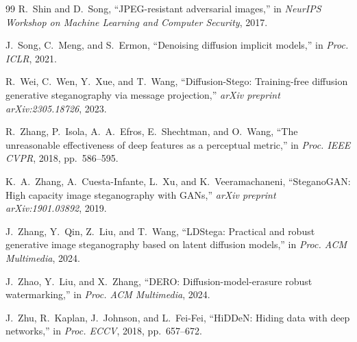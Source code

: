 \documentclass[journal]{IEEEtran}
\begin{document}
\begin{thebibliography}{99}
R.~Shin and D.~Song, ``JPEG-resistant adversarial images,'' in \emph{NeurIPS Workshop on Machine Learning and Computer Security}, 2017.

J.~Song, C.~Meng, and S.~Ermon, ``Denoising diffusion implicit models,'' in \emph{Proc. ICLR}, 2021.

R.~Wei, C.~Wen, Y.~Xue, and T.~Wang, ``Diffusion-Stego: Training-free diffusion generative steganography via message projection,'' \emph{arXiv preprint arXiv:2305.18726}, 2023.

R.~Zhang, P.~Isola, A.~A.~Efros, E.~Shechtman, and O.~Wang, ``The unreasonable effectiveness of deep features as a perceptual metric,'' in \emph{Proc. IEEE CVPR}, 2018, pp.~586--595.

K.~A.~Zhang, A.~Cuesta-Infante, L.~Xu, and K.~Veeramachaneni, ``SteganoGAN: High capacity image steganography with GANs,'' \emph{arXiv preprint arXiv:1901.03892}, 2019.

J.~Zhang, Y.~Qin, Z.~Liu, and T.~Wang, ``LDStega: Practical and robust generative image steganography based on latent diffusion models,'' in \emph{Proc. ACM Multimedia}, 2024.

J.~Zhao, Y.~Liu, and X.~Zhang, ``DERO: Diffusion-model-erasure robust watermarking,'' in \emph{Proc. ACM Multimedia}, 2024.

J.~Zhu, R.~Kaplan, J.~Johnson, and L.~Fei-Fei, ``HiDDeN: Hiding data with deep networks,'' in \emph{Proc. ECCV}, 2018, pp.~657--672.

\end{thebibliography}
\end{document}
